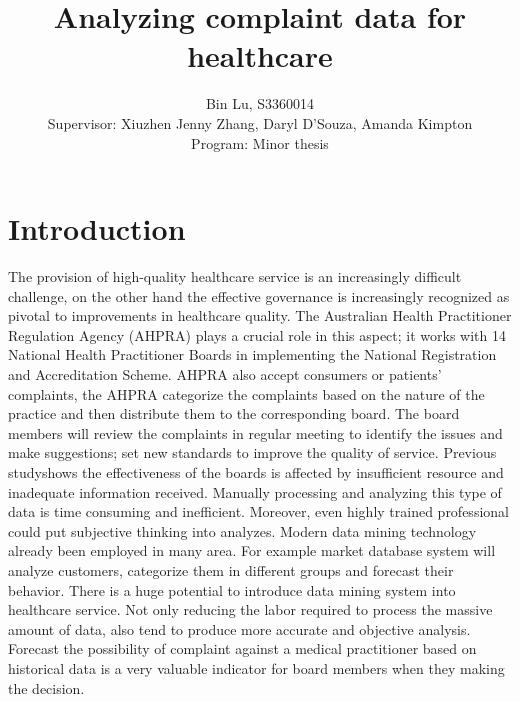 \documentclass[10pt,twocolumn]{article}
\title{Analyzing complaint data for healthcare}
\author{Bin Lu, S3360014\\Supervisor: Xiuzhen Jenny Zhang, Daryl D'Souza, Amanda Kimpton\\Program: Minor thesis}
\begin{document}
\maketitle
\thispagestyle{empty}

\section{Introduction}
The provision of high-quality healthcare service is an increasingly difficult challenge, on the other hand the effective governance is increasingly recognized as pivotal to improvements in healthcare quality\cite{ref6}. The Australian Health Practitioner Regulation Agency (AHPRA) plays a crucial role in this aspect; it works with 14 National Health Practitioner Boards in implementing the National Registration and Accreditation Scheme. AHPRA also accept consumers or patients’ complaints, the AHPRA categorize the complaints based on the nature of the practice and then distribute them to the corresponding board. The board members will review the complaints in regular meeting to identify the issues and make suggestions; set new standards to improve the quality of service. Previous study\cite{ref5}shows the effectiveness of the boards is affected by insufficient resource and inadequate information received. Manually processing and analyzing this type of data is time consuming and inefficient. Moreover, even highly trained professional could put subjective thinking into analyzes. Modern data mining technology already been employed in many area. For example market database system will analyze customers, categorize them in different groups and forecast their behavior. There is a huge potential to introduce data mining system into healthcare service. Not only reducing the labor required to process the massive amount of data, also tend to produce more accurate and objective analysis. Forecast the possibility of complaint against a medical practitioner based on historical data is a very valuable indicator for board members when they making the decision.\\
\end{document}
